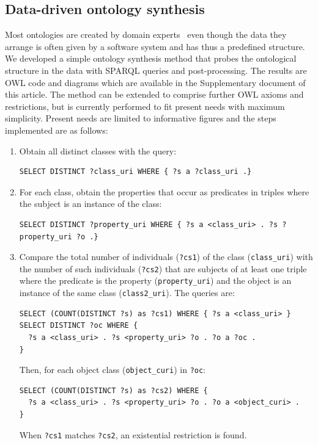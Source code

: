 \documentclass[data,datadescriptor,submit,moreauthors,pdftex]{Definitions/mdpi}
\newcommand{\textttt}[1] {\texttt{\footnotesize#1}}
\newcommand{\te}[1] {\texttt{\footnotesize#1}}
\begin{document}
\subsection{Data-driven ontology synthesis}\label{ont}
Most ontologies are created by domain experts~\cite{ont}
even though the data they arrange is often given by a software system
and has thus a predefined structure.  
We developed a simple ontology synthesis method that probes
the ontological structure in the data with
SPARQL queries and post-processing.
The results are OWL code and diagrams which are available in the
Supplementary document of this article.
The method can be extended to comprise further OWL axioms and restrictions,
but is currently performed to fit present needs with maximum simplicity.
Present needs are limited to informative figures and
the steps implemented are as follows:
\begin{enumerate}
    \item Obtain all distinct classes with the query:
\begin{lstlisting}[language=spq]
SELECT DISTINCT ?class_uri WHERE { ?s a ?class_uri .}
\end{lstlisting}
\item For each class, obtain the properties that occur as predicates in triples where the subject is an instance of the class:
\begin{lstlisting}[language=spq]
SELECT DISTINCT ?property_uri WHERE { ?s a <class_uri> . ?s ?property_uri ?o .}
\end{lstlisting}
\item Compare the total number of individuals (\te{?cs1}) of the class (\te{class\_uri}) with
	the number of such individuals (\te{?cs2}) that are subjects of at least one triple where 
        the predicate is the property (\te{property\_uri}) and the object is
        an instance of the same class (\te{class2\_uri}).
	The queries are:
\begin{lstlisting}[language=spq]
SELECT (COUNT(DISTINCT ?s) as ?cs1) WHERE { ?s a <class_uri> }
SELECT DISTINCT ?oc WHERE {
  ?s a <class_uri> . ?s <property_uri> ?o . ?o a ?oc .
}
\end{lstlisting}
        Then, for each object class (\textttt{object\_curi}) in \textttt{?oc}:
\begin{lstlisting}[language=spq]
SELECT (COUNT(DISTINCT ?s) as ?cs2) WHERE {
  ?s a <class_uri> . ?s <property_uri> ?o . ?o a <object_curi> .
}
\end{lstlisting}
        When \te{?cs1} matches \te{?cs2}, an existential restriction is found.

\end{enumerate}
\end{document}
